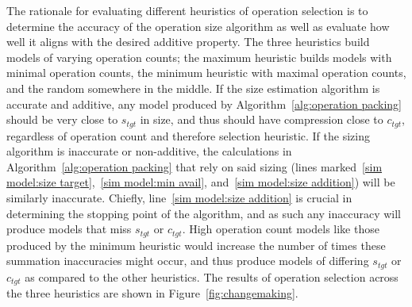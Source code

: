 The rationale for evaluating different heuristics of operation selection is to determine the accuracy of the
operation size algorithm as well as evaluate how well it aligns with the desired additive property. The three heuristics
build models of varying operation counts; the maximum heuristic builds models with minimal operation counts, the minimum
heuristic with maximal operation counts, and the random somewhere in the middle. If the size estimation algorithm is
accurate and additive, any model produced by Algorithm~\ref{alg:operation packing} should be very close to $s_{tgt}$ in size,
and thus should have compression close to $c_{tgt}$, regardless of operation count and therefore selection heuristic.
If the sizing algorithm is inaccurate or non-additive, the calculations in Algorithm~\ref{alg:operation packing} that
rely on said sizing (lines marked~\ref{sim model:size target},~\ref{sim model:min avail}, and~\ref{sim model:size addition})
will be similarly inaccurate. Chiefly, line~\ref{sim model:size addition} is crucial in determining the stopping point of
the algorithm, and as such any inaccuracy will produce models that miss $s_{tgt}$ or $c_{tgt}$. High operation count
models like those produced by the minimum heuristic would increase the number of times these summation inaccuracies might
occur, and thus produce models of differing $s_{tgt}$ or $c_{tgt}$ as compared to the other heuristics. The results of
operation selection across the three heuristics are shown in Figure~\ref{fig:changemaking}.

